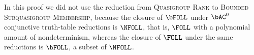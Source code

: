 


In this proof we did not use the reduction from \textsc{Quasigroup Rank} to \textsc{Bounded Subquasigroup Membership}, because the closure of $\bFOLL$ under $\bAC^0$ conjunctive truth-table reductions is $\NFOLL$, that is, $\FOLL$ with a polynomial amount of nondeterminism, whereas the closure of $\FOLL$ under the same reductions is $\bFOLL$, a subset of $\NFOLL$.

